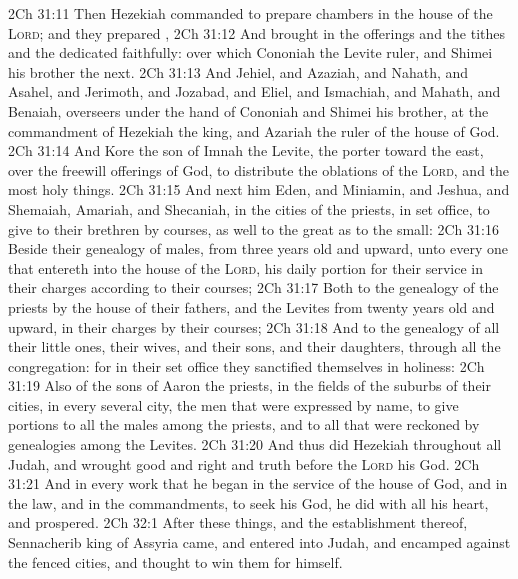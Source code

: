 \vs 2Ch 31:11 Then Hezekiah commanded to prepare chambers in the house of the \textsc{Lord}; and they prepared ,
\vs 2Ch 31:12 And brought in the offerings and the tithes and the dedicated  faithfully: over which Cononiah the Levite  ruler, and Shimei his brother  the next.
\vs 2Ch 31:13 And Jehiel, and Azaziah, and Nahath, and Asahel, and Jerimoth, and Jozabad, and Eliel, and Ismachiah, and Mahath, and Benaiah,  overseers under the hand of Cononiah and Shimei his brother, at the commandment of Hezekiah the king, and Azariah the ruler of the house of God.
\vs 2Ch 31:14 And Kore the son of Imnah the Levite, the porter toward the east,  over the freewill offerings of God, to distribute the oblations of the \textsc{Lord}, and the most holy things.
\vs 2Ch 31:15 And next him  Eden, and Miniamin, and Jeshua, and Shemaiah, Amariah, and Shecaniah, in the cities of the priests, in  set office, to give to their brethren by courses, as well to the great as to the small:
\vs 2Ch 31:16 Beside their genealogy of males, from three years old and upward,  unto every one that entereth into the house of the \textsc{Lord}, his daily portion for their service in their charges according to their courses;
\vs 2Ch 31:17 Both to the genealogy of the priests by the house of their fathers, and the Levites from twenty years old and upward, in their charges by their courses;
\vs 2Ch 31:18 And to the genealogy of all their little ones, their wives, and their sons, and their daughters, through all the congregation: for in their set office they sanctified themselves in holiness:
\vs 2Ch 31:19 Also of the sons of Aaron the priests,  in the fields of the suburbs of their cities, in every several city, the men that were expressed by name, to give portions to all the males among the priests, and to all that were reckoned by genealogies among the Levites.
\vs 2Ch 31:20 And thus did Hezekiah throughout all Judah, and wrought  good and right and truth before the \textsc{Lord} his God.
\vs 2Ch 31:21 And in every work that he began in the service of the house of God, and in the law, and in the commandments, to seek his God, he did  with all his heart, and prospered.
\vs 2Ch 32:1 After these things, and the establishment thereof, Sennacherib king of Assyria came, and entered into Judah, and encamped against the fenced cities, and thought to win them for himself.

